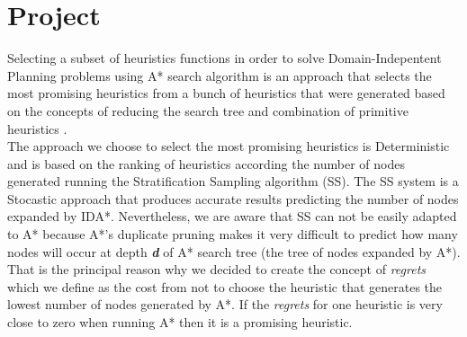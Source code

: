 \documentclass[11pt,a4paper,oneside]{report}
\begin{document}




\section{Project}
Selecting a subset of heuristics functions in order to solve Domain-Indepentent Planning problems using A* search algorithm is an approach that selects the most promising heuristics from a bunch of heuristics that were generated based on the concepts of reducing the search tree and combination of primitive heuristics \citep{BarleySantiagoOver}.\\

The approach we choose to select the most promising heuristics is Deterministic and is based on the ranking of heuristics according the number of nodes generated running the Stratification Sampling algorithm (SS). The SS system \citep{lelis2013predicting} is a Stocastic approach that produces accurate results predicting the number of nodes expanded by IDA*. Nevertheless, we are aware that SS can not be easily adapted to A* because A*'s duplicate pruning makes it very difficult to predict how many nodes will occur at depth \textit{\textbf{d}} of A* search tree (the tree of nodes expanded by A*). That is the principal reason why we decided to create the concept of \textit{regrets} which we define as the cost from not to choose the heuristic that generates the lowest number of nodes generated by A*. If the \textit{regrets} for one heuristic is very close to zero when running A* then it is a promising heuristic.\\
\end{document}
